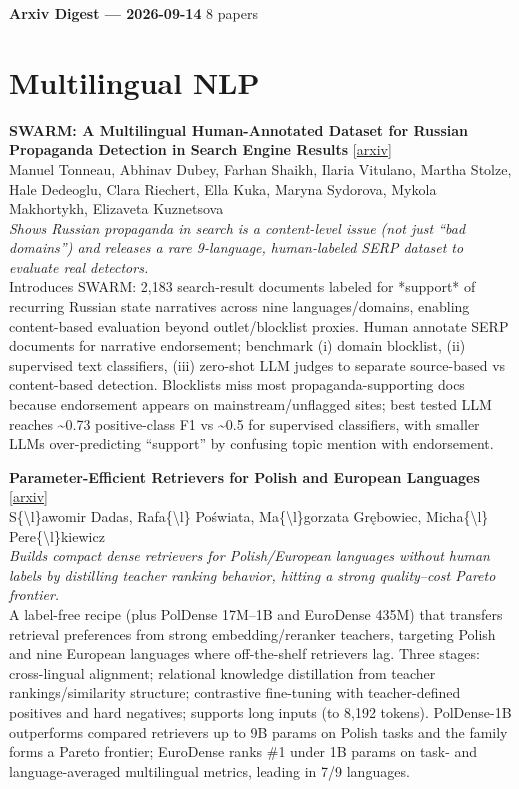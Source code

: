 \documentclass[12pt,letterpaper]{article}
\begin{document}
{\footnotesize\textbf{Arxiv Digest --- 2026-09-14} \hfill 8 papers}

\smallskip

\section*{Multilingual NLP}

{\small\textbf{SWARM: A Multilingual Human-Annotated Dataset for Russian Propaganda Detection in Search Engine Results}} {\scriptsize[\href{https://arxiv.org/abs/2609.12653}{arxiv}]}\\
{\scriptsize Manuel Tonneau, Abhinav Dubey, Farhan Shaikh, Ilaria Vitulano, Martha Stolze, Hale Dedeoglu, Clara Riechert, Ella Kuka, Maryna Sydorova, Mykola Makhortykh, Elizaveta Kuznetsova}\\

{\small\textit{Shows Russian propaganda in search is a content-level issue (not just ``bad domains'') and releases a rare 9-language, human-labeled SERP dataset to evaluate real detectors.}}\\[1pt]
{\footnotesize Introduces SWARM: 2,183 search-result documents labeled for *support* of recurring Russian state narratives across nine languages/domains, enabling content-based evaluation beyond outlet/blocklist proxies. Human annotate SERP documents for narrative endorsement; benchmark (i) domain blocklist, (ii) supervised text classifiers, (iii) zero-shot LLM judges to separate source-based vs content-based detection. Blocklists miss most propaganda-supporting docs because endorsement appears on mainstream/unflagged sites; best tested LLM reaches \textasciitilde{}0.73 positive-class F1 vs \textasciitilde{}0.5 for supervised classifiers, with smaller LLMs over-predicting ``support'' by confusing topic mention with endorsement.}

\medskip

{\small\textbf{Parameter-Efficient Retrievers for Polish and European Languages}} {\scriptsize[\href{https://arxiv.org/abs/2609.12913}{arxiv}]}\\
{\scriptsize S\{\textbackslash{}l\}awomir Dadas, Rafa\{\textbackslash{}l\} Po\'swiata, Ma\{\textbackslash{}l\}gorzata Gr\k{e}bowiec, Micha\{\textbackslash{}l\} Pere\{\textbackslash{}l\}kiewicz}\\

{\small\textit{Builds compact dense retrievers for Polish/European languages without human labels by distilling teacher ranking behavior, hitting a strong quality--cost Pareto frontier.}}\\[1pt]
{\footnotesize A label-free recipe (plus PolDense 17M--1B and EuroDense 435M) that transfers retrieval preferences from strong embedding/reranker teachers, targeting Polish and nine European languages where off-the-shelf retrievers lag. Three stages: cross-lingual alignment; relational knowledge distillation from teacher rankings/similarity structure; contrastive fine-tuning with teacher-defined positives and hard negatives; supports long inputs (to 8,192 tokens). PolDense-1B outperforms compared retrievers up to 9B params on Polish tasks and the family forms a Pareto frontier; EuroDense ranks \#1 under 1B params on task- and language-averaged multilingual metrics, leading in 7/9 languages.}
\end{document}
